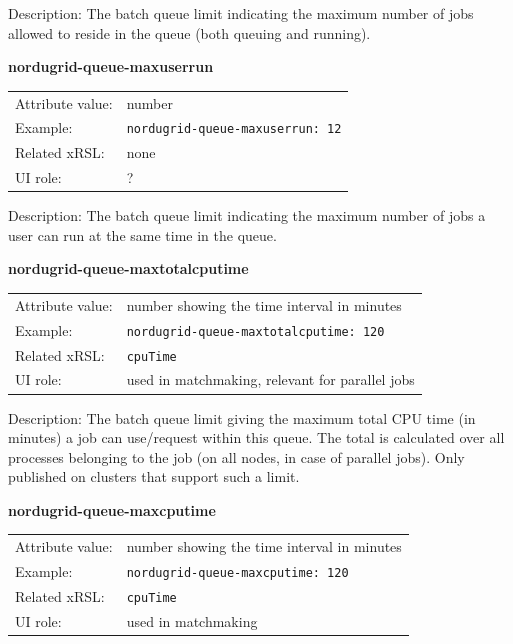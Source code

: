 \documentclass{article}
\begin{document}
Description: The batch queue limit indicating the 
maximum number of jobs allowed to reside in the queue (both queuing and running).


  \hspace*{0.5cm}
  \begin{shaded}
    \textbf{nordugrid-queue-maxuserrun}
  \end{shaded}
  \begin{tabular}{lp{10cm}}  
    Attribute value:& number\\
    Example:& \verb#nordugrid-queue-maxuserrun: 12#\\
    Related xRSL:& none\\
    UI role:& ?\\
  \end{tabular}

Description: The batch queue limit indicating the 
maximum number of jobs a user can run at the same time in the queue.


  \hspace*{0.5cm}
  \begin{shaded}
    \textbf{nordugrid-queue-maxtotalcputime}
  \end{shaded}
  \begin{tabular}{lp{10cm}}  
    Attribute value:& number showing the time interval in minutes\\
    Example:& \verb#nordugrid-queue-maxtotalcputime: 120#\\
    Related xRSL:& \verb#cpuTime#\\
    UI role:& used in matchmaking, relevant for parallel jobs\\
  \end{tabular}

Description: The batch queue limit giving the maximum total CPU time (in
minutes) a job can use/request within this queue. The total is calculated over
all processes belonging to the job (on all nodes, in case of parallel jobs).
Only published on clusters that support such a limit.


  \hspace*{0.5cm}
  \begin{shaded}
    \textbf{nordugrid-queue-maxcputime}
  \end{shaded}
  \begin{tabular}{lp{10cm}}  
    Attribute value:& number showing the time interval in minutes\\
    Example:& \verb#nordugrid-queue-maxcputime: 120#\\
    Related xRSL:& \verb#cpuTime#\\
    UI role:& used in matchmaking\\
  \end{tabular}
\end{document}
